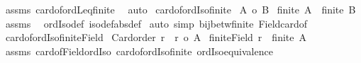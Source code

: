 \begin{isabellebody}
%
\isadelimproof
%
\endisadelimproof
%
\isatagproof
{}\isamarkupfalse%
\ assms\ card{\isacharunderscore}{\kern0pt}of{\isacharunderscore}{\kern0pt}ordLeq{\isacharunderscore}{\kern0pt}finite\ \isamarkupfalse%
\ auto%
\endisatagproof
{\isafoldproof}%
%
\isadelimproof
\isanewline
%
\endisadelimproof
\isanewline
{}\isamarkupfalse%
\ card{\isacharunderscore}{\kern0pt}of{\isacharunderscore}{\kern0pt}ordIso{\isacharunderscore}{\kern0pt}finite{\isacharcolon}{\kern0pt}\isanewline
{}\ {\isachardoublequoteopen}{\isacharbar}{\kern0pt}A{\isacharbar}{\kern0pt}\ {\isacharequal}{\kern0pt}o\ {\isacharbar}{\kern0pt}B{\isacharbar}{\kern0pt}{\isachardoublequoteclose}\isanewline
{}\ {\isachardoublequoteopen}finite\ A\ {\isacharequal}{\kern0pt}\ finite\ B{\isachardoublequoteclose}\isanewline
%
\isadelimproof
%
\endisadelimproof
%
\isatagproof
{}\isamarkupfalse%
\ assms\ \isamarkupfalse%
\ ordIso{\isacharunderscore}{\kern0pt}def\ iso{\isacharunderscore}{\kern0pt}def{\isacharbrackleft}{\kern0pt}abs{\isacharunderscore}{\kern0pt}def{\isacharbrackright}{\kern0pt}\isanewline
{}\isamarkupfalse%
\ {\isacharparenleft}{\kern0pt}auto\ simp{\isacharcolon}{\kern0pt}\ bij{\isacharunderscore}{\kern0pt}betw{\isacharunderscore}{\kern0pt}finite\ Field{\isacharunderscore}{\kern0pt}card{\isacharunderscore}{\kern0pt}of{\isacharparenright}{\kern0pt}%
\endisatagproof
{\isafoldproof}%
%
\isadelimproof
\isanewline
%
\endisadelimproof
\isanewline
{}\isamarkupfalse%
\ card{\isacharunderscore}{\kern0pt}of{\isacharunderscore}{\kern0pt}ordIso{\isacharunderscore}{\kern0pt}finite{\isacharunderscore}{\kern0pt}Field{\isacharcolon}{\kern0pt}\isanewline
{}\ {\isachardoublequoteopen}Card{\isacharunderscore}{\kern0pt}order\ r{\isachardoublequoteclose}\ \ {\isachardoublequoteopen}r\ {\isacharequal}{\kern0pt}o\ {\isacharbar}{\kern0pt}A{\isacharbar}{\kern0pt}{\isachardoublequoteclose}\isanewline
{}\ {\isachardoublequoteopen}finite{\isacharparenleft}{\kern0pt}Field\ r{\isacharparenright}{\kern0pt}\ {\isacharequal}{\kern0pt}\ finite\ A{\isachardoublequoteclose}\isanewline
%
\isadelimproof
%
\endisadelimproof
%
\isatagproof
{}\isamarkupfalse%
\ assms\ card{\isacharunderscore}{\kern0pt}of{\isacharunderscore}{\kern0pt}Field{\isacharunderscore}{\kern0pt}ordIso\ card{\isacharunderscore}{\kern0pt}of{\isacharunderscore}{\kern0pt}ordIso{\isacharunderscore}{\kern0pt}finite\ ordIso{\isacharunderscore}{\kern0pt}equivalence\ \isamarkupfalse%

\end{isabellebody}
